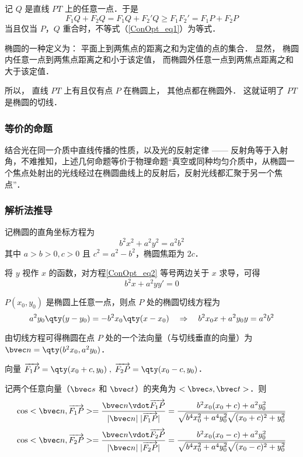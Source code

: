 记 $Q$ 是直线 $PT$ 上的任意一点．于是
\begin{equation}\label{ConOpt_eq1}
F_1Q + F_2Q = F_1Q + F_2'Q \geqslant F_1F_2' = F_1P + F_2P
\end{equation}
当且仅当 $P$，$Q$ 重合时，不等式（\autoref{ConOpt_eq1}）为等式．

椭圆的一种定义为：
平面上到两焦点的距离之和为定值的点的集合． 显然， 椭圆内任意一点到两焦点距离之和小于该定值， 而椭圆外任意一点到两焦点距离之和大于该定值． 

所以， 直线 $PT$ 上有且仅有点 $P$ 在椭圆上， 其他点都在椭圆外． 这就证明了 $PT$ 是椭圆的切线．

\subsubsection{等价的命题}
结合光在同一介质中直线传播的性质，以及光的反射定律 —— 反射角等于入射角，不难推知，上述几何命题等价于物理命题“真空或同种均匀介质中，从椭圆一个焦点处射出的光线经过在椭圆曲线上的反射后，反射光线都汇聚于另一个焦点”．

\subsubsection{解析法推导}
记椭圆的直角坐标方程为
\begin{equation}\label{ConOpt_eq2}
b^2 x^2 +a^2 y^2=a^2 b^2
\end{equation}
其中 $a>b>0,c>0$ 且 $c^2=a^2-b^2$，椭圆焦距为 $2c$．

将 $y$ 视作 $x$ 的函数，对方程\autoref{ConOpt_eq2} 等号两边关于 $x$ 求导，可得
\begin{equation}
b^2 x +a^2 yy'= 0
\end{equation}

$P(x_0,y_0)$ 是椭圆上任意一点，则点 $P$ 处的椭圆切线方程为
\begin{equation}
a^2 y_0 \qty(y - y_0) = - b^2 x_0 \qty(x - x_0) \quad
\Rightarrow \quad
b^2 x_0 x + a^2 y_0 y = a^2 b^2
\end{equation}

由切线方程可得椭圆在点 $P$ 处的一个法向量（与切线垂直的向量）为 $\bvec n = \qty(b^2 x_0,a^2 y_0)$．

向量 $\overrightarrow{F_1P}=\qty(x_0 +c,y_0)\; ,\; \overrightarrow{F_2P}=\qty(x_0 -c,y_0)$．

记两个任意向量（$\bvec s$ 和 $\bvec t$）的夹角为 $<\bvec s,\bvec t>$．则
\begin{equation}\label{ConOpt_eq5}
\cos<\bvec n,\overrightarrow{F_1P}>=\frac{\bvec n \vdot \overrightarrow{F_1P}}{|\bvec n| \; |\overrightarrow{F_1P}|}= \frac{b^2 x_0 (x_0+c)+a^2 y_0^2}{\sqrt{b^4 x_0^2+a^4 y_0^2}\sqrt{(x_0+c)^2+y_0^2}}
\end{equation}
\begin{equation}\label{ConOpt_eq6}
\cos<\bvec n,\overrightarrow{F_2P}>=\frac{\bvec n \vdot \overrightarrow{F_2P}}{|\bvec n| \; |\overrightarrow{F_2P}|}= \frac{b^2 x_0 (x_0-c)+a^2 y_0^2}{\sqrt{b^4 x_0^2+a^4 y_0^2}\sqrt{(x_0-c)^2+y_0^2}}
\end{equation}

